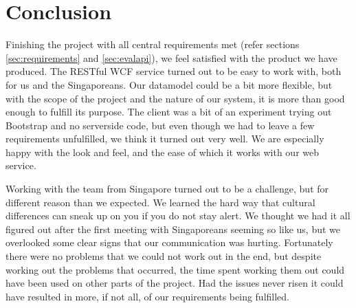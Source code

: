 \section{Conclusion}
Finishing the project with all central requirements met (refer sections
\ref{sec:requirements} and \ref{sec:evalapi}), we feel satisfied with the product
we have produced. 
The RESTful WCF service turned out to be easy to work with,
both for us and the Singaporeans. Our datamodel could be a bit more flexible, but
with the scope of the project and the nature of our system, it is more than good
enough to fulfill its purpose.
The client was a bit of an experiment trying out Bootstrap and no serverside code,
but even though we had to leave a few requirements unfulfilled, we think it 
turned out very well. We are especially happy with the look and feel, and the
ease of which it works with our web service. 

Working with the team from Singapore turned out to be a challenge, but for 
different reason than we expected. We learned the hard way that 
cultural differences can sneak up on you if you do not stay alert. We
thought we had it all figured out after the first meeting with Singaporeans
seeming so like us, but we overlooked some clear signs that our communication
was hurting.
Fortunately there were no problems that we could not work out in the end, but
despite working out the problems that occurred, the time spent  working them out
 could have been used on other parts of the project. 
Had the issues never risen it could have resulted in more, if not all, of our requirements being fulfilled.

